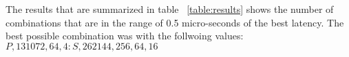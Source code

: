 The results that are summarized in table ~\ref{table:results} shows the number
of combinations that are in the range of 0.5 micro-seconds of the best
latency. The best possible combination was with the follwoing values:
$P,131072,64,4:S,262144,256,64,16$

